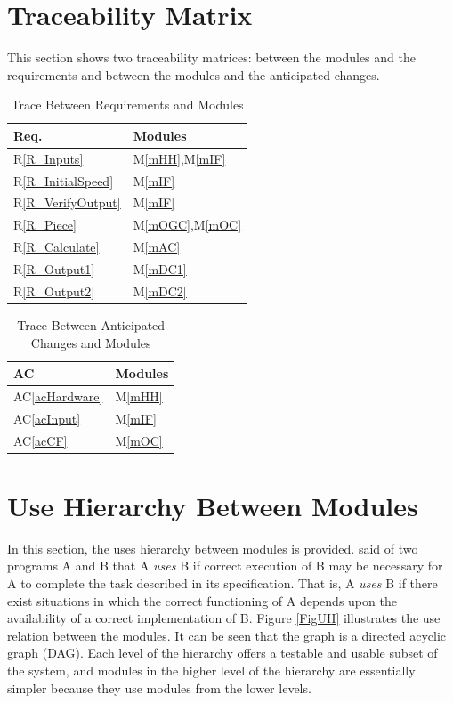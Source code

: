 \documentclass[12pt, titlepage]{article}
\newcommand{\rref}[1]{R\ref{#1}}
\newcommand{\acref}[1]{AC\ref{#1}}
\newcommand{\mref}[1]{M\ref{#1}}
\begin{document}
	\section{Traceability Matrix} \label{SecTM}
	
	This section shows two traceability matrices: between the modules and the
	requirements and between the modules and the anticipated changes.
	
	\begin{table}[H]
		\centering
		\begin{tabular}{p{} p{}}
			\toprule
			\textbf{Req.} & \textbf{Modules}\\
			\midrule
			\rref{R_Inputs} & \mref{mHH},\mref{mIF}\\
			\rref{R_InitialSpeed} & \mref{mIF}\\
			\rref{R_VerifyOutput} & \mref{mIF}\\
			\rref{R_Piece} & \mref{mOGC},\mref{mOC}\\
			\rref{R_Calculate} & \mref{mAC}\\
			\rref{R_Output1} & \mref{mDC1}\\
			\rref{R_Output2} & \mref{mDC2}\\
			\bottomrule
		\end{tabular}
		\caption{Trace Between Requirements and Modules}
		\label{TblRT}
	\end{table}
	
	\begin{table}[H]
		\centering
		\begin{tabular}{p{} p{}}
			\toprule
			\textbf{AC} & \textbf{Modules}\\
			\midrule
			\acref{acHardware} & \mref{mHH}\\
			\acref{acInput} & \mref{mIF}\\
			\acref{acCF} & \mref{mOC}\\
			\bottomrule
		\end{tabular}
		\caption{Trace Between Anticipated Changes and Modules}
		\label{TblACT}
	\end{table}
	
	\section{Use Hierarchy Between Modules} \label{SecUse}
	
	In this section, the uses hierarchy between modules is
	provided. \citet{Parnas1978} said of two programs A and B that A {\em uses} B if
	correct execution of B may be necessary for A to complete the task described in
	its specification. That is, A {\em uses} B if there exist situations in which
	the correct functioning of A depends upon the availability of a correct
	implementation of B.  Figure \ref{FigUH} illustrates the use relation between
	the modules. It can be seen that the graph is a directed acyclic graph
	(DAG). Each level of the hierarchy offers a testable and usable subset of the
	system, and modules in the higher level of the hierarchy are essentially simpler
	because they use modules from the lower levels.
	
\end{document}
